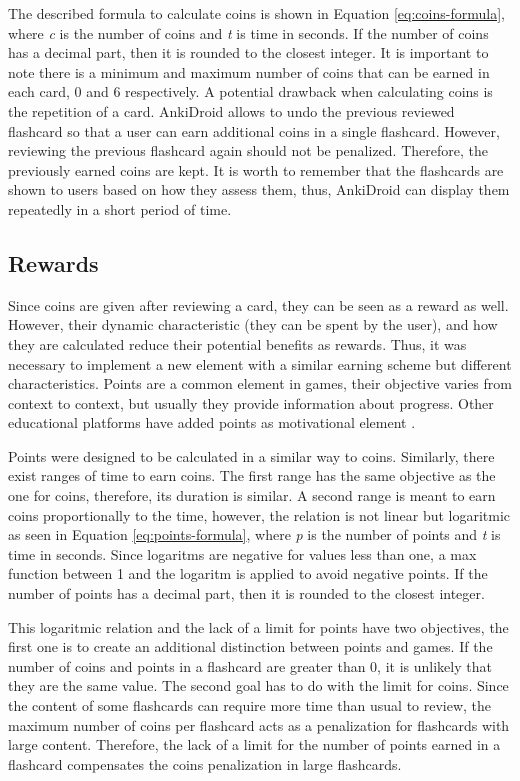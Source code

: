 The described formula to calculate coins is shown in Equation \ref{eq:coins-formula}, where \textit{c} is the number of coins and \textit{t} is time in seconds. If the number of coins has a decimal part, then it is rounded to the closest integer. It is important to note there is a minimum and maximum number of coins that can be earned in each card, 0 and 6 respectively. A potential drawback when calculating coins is the repetition of a card. AnkiDroid allows to undo the previous reviewed flashcard so that a user can earn additional coins in a single flashcard. However, reviewing the previous flashcard again should not be penalized. Therefore, the previously earned coins are kept. It is worth to remember that the flashcards are shown to users based on how they assess them, thus, AnkiDroid can display them repeatedly in a short period of time.

\subsection{Rewards}
Since coins are given after reviewing a card, they can be seen as a reward as well. However, their dynamic characteristic (they can be spent by the user), and how they are calculated reduce their potential benefits as rewards. Thus, it was necessary to implement a new element with a similar earning scheme but different characteristics. Points are a common element in games, their objective varies from context to context, but usually they provide information about progress. Other educational platforms have added points as motivational element \citep{disalvo2014khan}.

Points were designed to be calculated in a similar way to coins. Similarly, there exist ranges of time to earn coins. The first range has the same objective as the one for coins, therefore, its duration is similar. A second range is meant to earn coins proportionally to the time, however, the relation is not linear but logaritmic as seen in Equation \ref{eq:points-formula}, where \textit{p} is the number of points and \textit{t} is time in seconds. Since logaritms are negative for values less than one, a max function between 1 and the logaritm is applied to avoid negative points. If the number of points has a decimal part, then it is rounded to the closest integer.

This logaritmic relation and the lack of a limit for points have two objectives, the first one is to create an additional distinction between points and games. If the number of coins and points in a flashcard are greater than 0, it is unlikely that they are the same value. The second goal has to do with the limit for coins. Since the content of some flashcards can require more time than usual to review, the maximum number of coins per flashcard acts as a penalization for flashcards with large content. Therefore, the lack of a limit for the number of points earned in a flashcard compensates the coins penalization in large flashcards.

